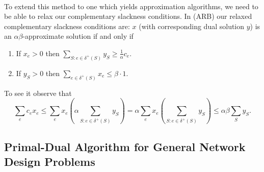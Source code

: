 \documentclass[letterpaper,12pt,oneside,onecolumn]{article}
\begin{document}
\paragraph{}
To extend this method to one which yields approximation algorithms, we need to be able to relax our complementary slackness conditions. In (ARB) our relaxed complementary slackness conditions are:  $x$ (with corresponding dual solution $y$) is an $\alpha \beta$-approximate solution if and only if
\begin{enumerate}
\item If $x_e > 0$ then $\sum_{S: e \in \delta^+(S)} y_S \geq \frac{1}{\alpha} c_e$.
\item If $y_S > 0$ then $\sum_{e\in \delta^+(S)} x_e \leq \beta \cdot 1$.
\end{enumerate}
To see it observe that
$$\sum_{e} c_e x_e \leq \sum_e x_e(\alpha \sum_{S: e \in \delta^+(S)} y_S) = \alpha \sum_{e}x_e(\sum_{S: e \in \delta^+(S)} y_S) \leq \alpha \beta \sum_S y_S.$$
\subsection{Primal-Dual Algorithm for General Network Design Problems}
\end{document}
